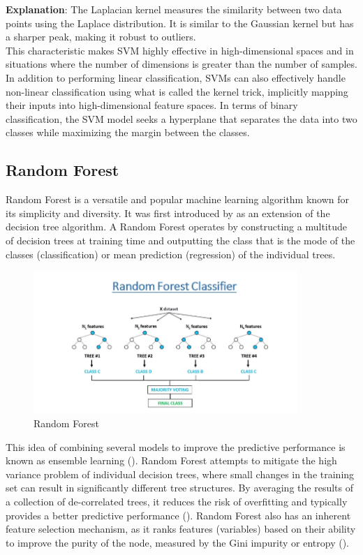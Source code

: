 \documentclass[12pt]{report}
\begin{document}
\textbf{Explanation}: The Laplacian kernel measures the similarity between two
data points using the Laplace distribution. It is similar to the Gaussian kernel
but has a sharper peak, making it robust to outliers.\\

This characteristic makes SVM highly effective in high-dimensional spaces and
in situations where the number of dimensions is greater than the number of
samples\cite{708428}. In addition to performing linear classification, SVMs can
also effectively handle non-linear classification using what is called the
kernel trick, implicitly mapping their inputs into high-dimensional feature
spaces\cite{10.1007/BFb0020217}. In terms of binary classification, the SVM
model seeks a hyperplane that separates the data into two classes while
maximizing the margin between the classes.

\newpage

\subsection*{Random Forest}
Random Forest is a versatile and popular machine learning algorithm known for
its simplicity and diversity. It was first introduced by\cite{Breiman2001} as
an extension of the decision tree algorithm. A Random Forest operates by
constructing a multitude of decision trees at training time and outputting the
class that is the mode of the classes (classification) or mean prediction
(regression) of the individual trees. \\

\begin{figure}[ht]
    \centering
    \includegraphics[width=10cm]{./figures/how-random-forest-classifier-work.png}
    \caption{Random Forest}\label{fig:fig2}
\end{figure}

This idea of combining several models to improve the predictive performance is
known as ensemble learning (\cite{Dietterich2000}). Random Forest attempts to
mitigate the high variance problem of individual decision trees, where small
changes in the training set can result in significantly different tree
structures. By averaging the results of a collection of de-correlated trees, it
reduces the risk of overfitting and typically provides a better predictive
performance (\cite{Sagi2018}). Random Forest also has an inherent feature
selection mechanism, as it ranks features (variables) based on their ability to
improve the purity of the node, measured by the Gini impurity or entropy
(\cite{DiazUriarte2006}).
\end{document}
